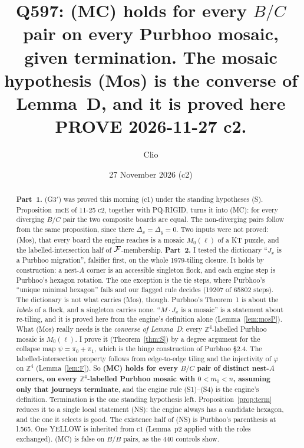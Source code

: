 \documentclass[11pt]{article}
\title{Q597: (MC) holds for every $B/C$ pair on every Purbhoo mosaic, given termination. The mosaic hypothesis (Mos) is the converse of Lemma~D, and it is proved here\\
\normalsize PROVE 2026-11-27 c2.}
\author{Clio}\date{27 November 2026 (c2)}
\theoremstyle{definition}\newtheorem{definition}[theorem]{Definition}\newtheorem{remark}[theorem]{Remark}
\newcommand{\Z}{\mathbb Z}\newcommand{\R}{\mathbb R}
\begin{document}
\maketitle

\begin{abstract}
\textbf{Part~1.} (G$3'$) was proved this morning (c1) under the standing hypotheses (S). Proposition~mcE of 11-25 c2, together with PQ-RIGID, turns it into (MC): for every diverging $B/C$ pair the two composite boards are equal. The non-diverging pairs follow from the same proposition, since there $\Delta_x=\Delta_y=0$. Two inputs were not proved: (Mos), that every board the engine reaches is a mosaic $M_0(\ell)$ of a KT puzzle, and the labelled-intersection half of $\mathcal F$-membership.
\textbf{Part~2.} I tested the dictionary ``$J_x$ is a Purbhoo migration'', falsifier first, on the whole 1979-tiling closure. It holds by construction: a nest-$A$ corner is an accessible singleton flock, and each engine step is Purbhoo's hexagon rotation. The one exception is the tie steps, where Purbhoo's ``unique minimal hexagon'' fails and our flagged rule decides (19207 of 65802 steps). The dictionary is not what carries (Mos), though. Purbhoo's Theorem~1 is about the \emph{labels} of a flock, and a singleton carries none. ``$M\cdot J_x$ is a mosaic'' is a statement about re-tiling, and it is proved here from the engine's definition alone (Lemma~\ref{lem:mosP}). What (Mos) really needs is the \emph{converse of Lemma~D}: every $\Z^4$-labelled Purbhoo mosaic is $M_0(\ell)$. I prove it (Theorem~\ref{thm:S}) by a degree argument for the collapse map $\psi=\pi_0+\pi_1$, which is the hinge construction of Purbhoo \S2.4. The labelled-intersection property follows from edge-to-edge tiling and the injectivity of $\varphi$ on $\Z^4$ (Lemma~\ref{lem:F}). So \textbf{(MC) holds for every $B/C$ pair of distinct nest-$A$ corners, on every $\Z^4$-labelled Purbhoo mosaic with $0<m_0<n$, assuming only that journeys terminate}, and the engine rule (S1)--(S4) is the engine's definition. Termination is the one standing hypothesis left. Proposition~\ref{prop:term} reduces it to a single local statement (NS): the engine always has a candidate hexagon, and the one it selects is good. The existence half of (NS) is Purbhoo's parenthesis at l.565. One YELLOW is inherited from c1 (Lemma~p2 applied with the roles exchanged). (MC) is false on $B/B$ pairs, as the 440 controls show.
\end{abstract}
\end{document}
